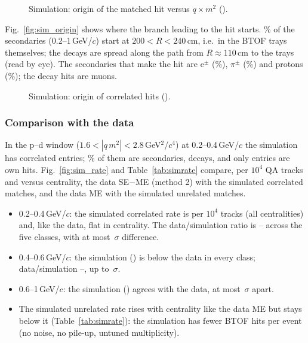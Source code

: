 

\begin{figure}[H]
\centering
{}
\caption{Simulation: origin of the matched hit versus $q\times m^2$ ().}
\end{figure}

Fig.~\ref{fig:sim_origin} shows where the branch leading to the hit starts. \simSecTray\% of the secondaries (0.2--1\,GeV/$c$) start at
$200<R<240$\,cm, i.e.\ in the BTOF trays themselves; the decays are spread along the path from $R\approx110$\,cm to the trays (read by eye). The
secondaries that make the hit are e$^\pm$ (\simSecElec\%), $\pi^\pm$ (\simSecPion\%) and protons (\simSecProton\%); the decay hits are muons.

\begin{figure}[H]
\centering
{}
\caption{Simulation: origin of correlated hits ().}
\end{figure}

\subsubsection{Comparison with the data}
In the p--d window ($1.6<|q\,m^2|<2.8$\,GeV$^2$/$c^4$) at 0.2--0.4\,GeV/$c$ the simulation has \simHiNCorr{} correlated entries;
\simHiSecShare\% of them are secondaries, \simHiNDec{} decays, and only \simHiNOwn{} entries are own hits.
Fig.~\ref{fig:sim_rate} and Table~\ref{tab:simrate} compare, per $10^4$ QA tracks and versus centrality, the data SE$-$ME (method 2)
with the simulated correlated matches, and the data ME with the simulated unrelated matches.
\begin{itemize}
\item 0.2--0.4\,GeV/$c$: the simulated correlated rate is \simCorrA{} per $10^4$ tracks (all centralities) and, like the data, flat in
  centrality. The data/simulation ratio is \simDataRatMinA--\simDataRatMaxA{} across the five classes, with at most
  \simNsigMaxA\,$\sigma$ difference.
\item 0.4--0.6\,GeV/$c$: the simulation (\simCorrB) is below the data in every class; data/simulation \simDataRatMinB--\simDataRatMaxB,
  up to \simNsigMaxB\,$\sigma$.
\item 0.6--1\,GeV/$c$: the simulation (\simCorrC) agrees with the data, at most \simNsigMaxC\,$\sigma$ apart.
\item The simulated unrelated rate rises with centrality like the data ME but stays below it (Table~\ref{tab:simrate}): the simulation
  has fewer BTOF hits per event (no noise, no pile-up, untuned multiplicity).
\end{itemize}

